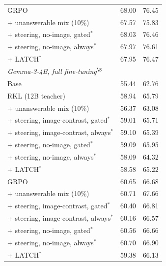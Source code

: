 \begin{table}[t]
\begin{tabular}{lcc}
GRPO                                          & 68.00 & 76.45 \\
\quad + unanswerable mix (10\%)               & 67.57 & 75.83 \\
\quad + steering, no-image, gated$^\ast$      & 68.03 & 76.46 \\
\quad + steering, no-image, always$^\ast$     & 67.97 & 76.61 \\
\quad + LATCH$^\ast$                          & 67.95 & 76.47 \\
\midrule
\multicolumn{3}{l}{\textit{Gemma-3-4B, full fine-tuning$^\S$}} \\
Base                                          & 55.44 & 62.76 \\
RKL (12B teacher)                             & 58.94 & 65.79 \\
\quad + unanswerable mix (10\%)               & 56.37 & 63.08 \\
\quad + steering, image-contrast, gated$^\ast$  & 59.01 & 65.71 \\
\quad + steering, image-contrast, always$^\ast$ & 59.10 & 65.39 \\
\quad + steering, no-image, gated$^\ast$      & 59.09 & 65.95 \\
\quad + steering, no-image, always$^\ast$     & 58.09 & 64.32 \\
\quad + LATCH$^\ast$                          & 58.58 & 65.22 \\
GRPO                                          & 60.65 & 66.68 \\
\quad + unanswerable mix (10\%)               & 60.71 & 67.66 \\
\quad + steering, image-contrast, gated$^\ast$  & 60.40 & 66.81 \\
\quad + steering, image-contrast, always$^\ast$ & 60.16 & 66.57 \\
\quad + steering, no-image, gated$^\ast$      & 60.56 & 66.66 \\
\quad + steering, no-image, always$^\ast$     & 60.70 & 66.90 \\
\quad + LATCH$^\ast$                          & 59.38 & 66.13 \\
\bottomrule
\end{tabular}
\end{table}


